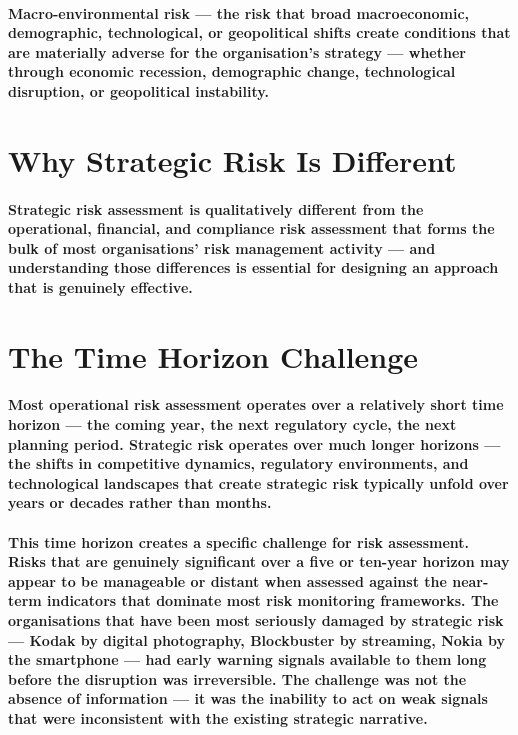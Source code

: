 \paragraph{\textbf{Macro-environmental risk} — the risk that broad macroeconomic, demographic, technological, or geopolitical shifts create conditions that are materially adverse for the organisation's strategy — whether through economic recession, demographic change, technological disruption, or geopolitical instability.}

\section{Why Strategic Risk Is Different}
\paragraph{Strategic risk assessment is qualitatively different from the operational, financial, and compliance risk assessment that forms the bulk of most organisations' risk management activity — and understanding those differences is essential for designing an approach that is genuinely effective.}

\section{The Time Horizon Challenge}
\paragraph{Most operational risk assessment operates over a relatively short time horizon — the coming year, the next regulatory cycle, the next planning period. Strategic risk operates over much longer horizons — the shifts in competitive dynamics, regulatory environments, and technological landscapes that create strategic risk typically unfold over years or decades rather than months.}
\paragraph{This time horizon creates a specific challenge for risk assessment. Risks that are genuinely significant over a five or ten-year horizon may appear to be manageable or distant when assessed against the near-term indicators that dominate most risk monitoring frameworks. The organisations that have been most seriously damaged by strategic risk — Kodak by digital photography, Blockbuster by streaming, Nokia by the smartphone — had early warning signals available to them long before the disruption was irreversible. The challenge was not the absence of information — it was the inability to act on weak signals that were inconsistent with the existing strategic narrative.}

